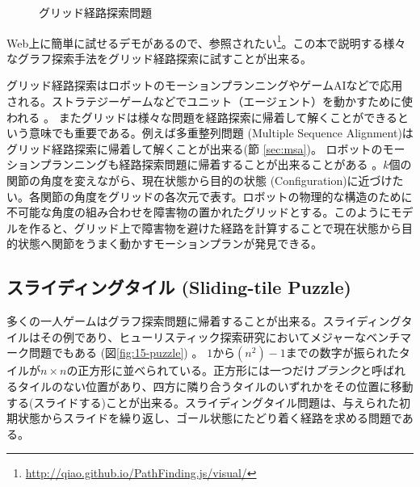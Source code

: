 \begin{figure}
        \centering
        \begin{tikzpicture}[scale=0.5]
          
        \end{tikzpicture}
	\caption{グリッド経路探索問題}
	\label{fig:grid-pathfinding}
\end{figure}


Web上に簡単に試せるデモがあるので、参照されたい\footnote{\url{http://qiao.github.io/PathFinding.js/visual/}}。この本で説明する様々なグラフ探索手法をグリッド経路探索に試すことが出来る。%

グリッド経路探索はロボットのモーションプランニングやゲームAIなどで応用される\cite{algfoor2015comprehensive}。ストラテジーゲームなどでユニット（エージェント）を動かすために使われる \cite{cui2011based,sturtevant2012benchmarks}。%
またグリッドは様々な問題を経路探索に帰着して解くことができるという意味でも重要である。例えば多重整列問題 (Multiple Sequence Alignment)はグリッド経路探索に帰着して解くことが出来る(節 \ref{sec:msa})。
ロボットのモーションプランニングも経路探索問題に帰着することが出来ることがある \cite{barraquand91}。$k$個の関節の角度を変えながら、現在状態から目的の状態 (Configuration)に近づけたい。各関節の角度をグリッドの各次元で表す。ロボットの物理的な構造のために不可能な角度の組み合わせを障害物の置かれたグリッドとする。このようにモデルを作ると、グリッド上で障害物を避けた経路を計算することで現在状態から目的状態へ関節をうまく動かすモーションプランが発見できる。


\subsection{スライディングタイル (Sliding-tile Puzzle)}

多くの一人ゲームはグラフ探索問題に帰着することが出来る。スライディングタイルはその例であり、ヒューリスティック探索研究においてメジャーなベンチマーク問題でもある (図\ref{fig:15-puzzle}) \cite{johnson1879notes}。
$1$から$(n^2)-1$までの数字が振られたタイルが$n\times n$の正方形に並べられている。正方形には一つだけ{\it ブランク}と呼ばれるタイルのない位置があり、四方に隣り合うタイルのいずれかをその位置に移動する(スライドする)ことが出来る。スライディングタイル問題は、与えられた初期状態からスライドを繰り返し、ゴール状態にたどり着く経路を求める問題である。

